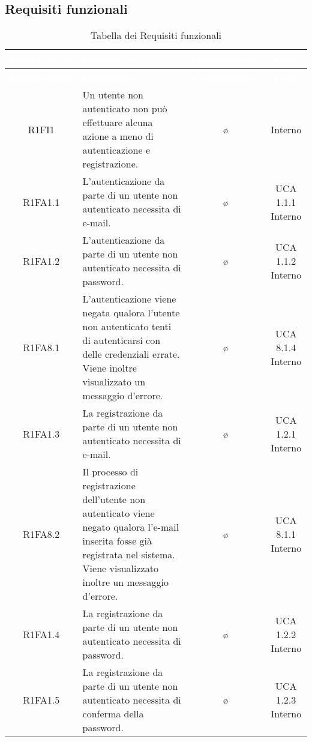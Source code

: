 \subsection{Requisiti funzionali}
{
\renewcommand{\arraystretch}{1.5}
\centering
\begin{longtable}{ c C{6.5cm} c c}
\caption{Tabella dei Requisiti funzionali}\\
\textcolor{white}{\textbf{Identificativo}} & \textcolor{white}{\textbf{Descrizione}} & \textcolor{white}{\textbf{Classificazione}} & \textcolor{white}{\textbf{Fonti}}\\	
\endfirsthead
{}
\textcolor{white}{\textbf{Identificativo}} & \textcolor{white}{\textbf{Descrizione}} & \textcolor{white}{\textbf{Classificazione}} & \textcolor{white}{\textbf{Fonti}}\\
\endhead

R1FI1 & Un utente non autenticato non può effettuare alcuna azione a meno di autenticazione e registrazione. & \o & Interno\\

R1FA1.1 & L'autenticazione da parte di un utente non autenticato necessita di e-mail. & \o & UCA 1.1.1 Interno\\

R1FA1.2 & L'autenticazione da parte di un utente non autenticato necessita di password. & \o & UCA 1.1.2 Interno\\

R1FA8.1 & L'autenticazione viene negata qualora l'utente non autenticato tenti di autenticarsi con delle credenziali errate. Viene inoltre visualizzato un messaggio d'errore. & \o & UCA 8.1.4 Interno\\

R1FA1.3 & La registrazione da parte di un utente non autenticato necessita di e-mail. & \o & UCA 1.2.1 Interno\\

R1FA8.2 & Il processo di registrazione dell'utente non autenticato viene negato qualora l'e-mail inserita fosse già registrata nel sistema. Viene visualizzato inoltre un messaggio d'errore. & \o & UCA 8.1.1 Interno\\

R1FA1.4 & La registrazione da parte di un utente non autenticato necessita di password. & \o & UCA 1.2.2 Interno\\

R1FA1.5 & La registrazione da parte di un utente non autenticato necessita di conferma della password. & \o & UCA 1.2.3 Interno\\


\end{longtable}}
